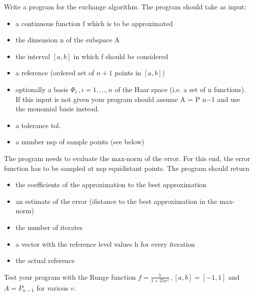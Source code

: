\begin{problem}
  Write a program for the exchange algorithm. The program should take
  as input:
  \begin{itemize}
  \item a continuous function f which is to be approximated
  \item the dimension n of the subspace A
  \item the interval $[a, b]$ in which f should be considered
  \item a reference (ordered set of $n + 1$ points in $[a, b]$)
  \item optionally a basis $\Phi_i \, , i = 1, \dots , n$ of the Haar
    space (i.e. a set of n functions).    
    If this input is not given your program should assume A = P n−1 and use the
    monomial basis instead.
  \item a tolerance tol.
  \item a number nsp of sample points (see below)
  \end{itemize}
  The program needs to evaluate the max-norm of the error. For this end, the error
  function has to be sampled at nsp equidistant points.
  The program should return
  \begin{itemize}
  \item the coefficients of the approximation to the best approximation
  \item an estimate of the error (distance to the best approximation in the max-norm)
  \item  the number of iterates
  \item  a vector with the reference level values h for every iteration
  \item  the actual reference
  \end{itemize}

  Test your program with the Runge function
  $f = \frac{1}{1 + 25x^2 } \, , [a, b] = [-1, 1]$ and $A = P_{n-1}$
    for various $v$.
  \end{problem}


  \begin{solution}

  \end{solution}

